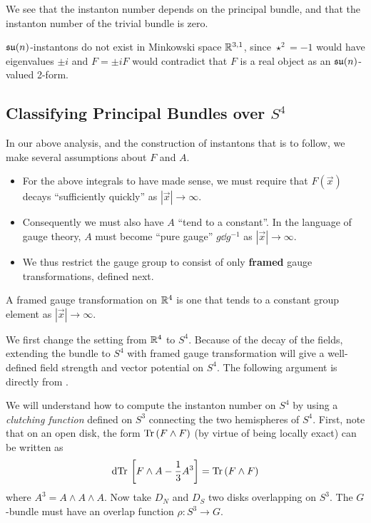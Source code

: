	We see that the instanton number depends on the principal bundle, and that the instanton number of the trivial bundle is zero. 
	
	\begin{nb}
		$\frak{su}(n)$-instantons do not exist in Minkowski space $\mathbb{R}^{3,1}$, since $\star^2 = -1$ would have eigenvalues $\pm i$ and $F = \pm i F$ would contradict that $F$ is a real object as an $\frak{su}(n)$-valued 2-form.
	\end{nb}



	\subsection{Classifying Principal Bundles over $S^4$} %
	\label{sub:classifying_principal_bundles_over_s_4}

		In our above analysis, and the construction of instantons that is to follow, we make several assumptions about $F$ and $A$.
		\begin{itemize}
			\item For the above integrals to have made sense, we must require that $F(\vec x)$ decays ``sufficiently quickly'' as $|\vec x| \to \infty$.
			\item Consequently we must also have $A$ ``tend to a constant''. In the language of gauge theory, $A$ must become ``pure gauge'' $g \dd g^{-1}$ as $|\vec x| \to \infty$.
			\item We thus restrict the gauge group to consist of only \textbf{framed} gauge transformations, defined next.
		\end{itemize}
		\begin{defn}
			A framed gauge transformation on $\mathbb{R}^4$ is one that tends to a constant group element as $|\vec x| \to \infty$.
		\end{defn}

		We first change the setting from $\mathbb{R}^4$ to $S^4$. Because of the decay of the fields, extending the bundle to $S^4$ with framed gauge transformation will give a well-defined field strength and vector potential on $S^4$. The following argument is directly from \cite{lindenhovius2011}.
	
		We will understand how to compute the instanton number on $S^4$ by using a \emph{clutching function} defined on $S^3$ connecting the two hemispheres of $S^4$. First, note that on an open disk, the form $\mathrm{Tr}\, (F \wedge F)$ (by virtue of being locally exact) can be written as 
		\[
			\mathrm{d} \mathrm{Tr}\, \left[F \wedge A - \frac13 A^3 \right] = \mathrm{Tr}\,( F \wedge F)
		\]
		where $A^3 = A \wedge A \wedge A$.
		Now take $D_N$ and $D_S$ two disks overlapping on $S^3$. The $G$-bundle must have an overlap function $\rho: S^3 \to G$.
	
